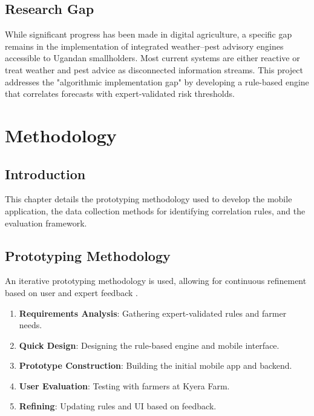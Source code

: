 \documentclass[12pt]{report}
\begin{document}
\section{Research Gap}
While significant progress has been made in digital agriculture, a specific gap remains in the implementation of integrated weather--pest advisory engines accessible to Ugandan smallholders. Most current systems are either reactive or treat weather and pest advice as disconnected information streams. This project addresses the "algorithmic implementation gap" by developing a rule-based engine that correlates forecasts with expert-validated risk thresholds.

\chapter{Methodology}

\section{Introduction}
This chapter details the prototyping methodology used to develop the mobile application, the data collection methods for identifying correlation rules, and the evaluation framework.

\section{Prototyping Methodology}
An iterative prototyping methodology is used, allowing for continuous refinement based on user and expert feedback \cite{Lewis2019}.
\begin{enumerate}
    \item \textbf{Requirements Analysis}: Gathering expert-validated rules and farmer needs.
    \item \textbf{Quick Design}: Designing the rule-based engine and mobile interface.
    \item \textbf{Prototype Construction}: Building the initial mobile app and backend.
    \item \textbf{User Evaluation}: Testing with farmers at Kyera Farm.
    \item \textbf{Refining}: Updating rules and UI based on feedback.
\end{enumerate}
\end{document}

